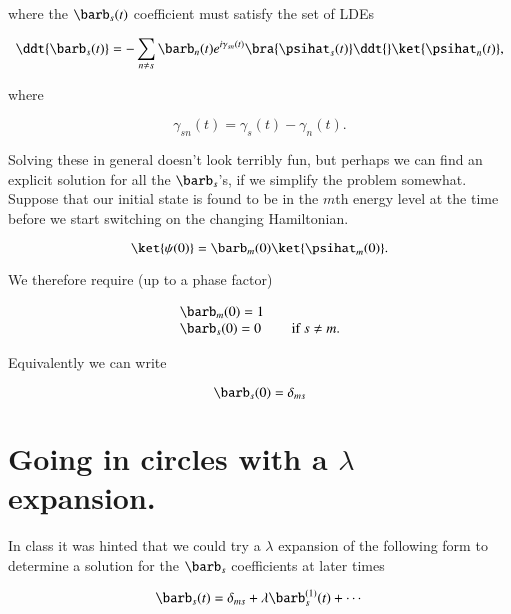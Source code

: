 where the $\barb_s(t)$ coefficient must satisfy the set of LDEs 

\begin{equation}\label{eqn:adiabaticApprox:50}
\ddt{\barb_s(t)} = - \sum_{n \ne s} \barb_n(t) e^{i \gamma_{sn}(t) } \bra{\psihat_s(t)} \ddt{} \ket{\psihat_n(t)},
\end{equation}

where

\begin{equation}\label{eqn:adiabaticApprox:70}
\gamma_{sn}(t) = \gamma_{s}(t) - \gamma_{n}(t).
\end{equation}

Solving these in general doesn't look terribly fun, but perhaps we can find an explicit solution for all the $\barb_s$'s, if we simplify the problem somewhat.  Suppose that our initial state is found to be in the $m$th energy level at the time before we start switching on the changing Hamiltonian.

\begin{equation}\label{eqn:adiabaticApprox:90}
\ket{\psi(0)} = \barb_m(0) \ket{\psihat_m(0)}.
\end{equation}

We therefore require (up to a phase factor)

\begin{equation}\label{eqn:adiabaticApprox:110}
\begin{array}{l l}
\barb_m(0) = 1 & \\
\barb_s(0) = 0 & \quad \mbox{if $s \ne m$}.
\end{array}
\end{equation}

Equivalently we can write

\begin{equation}\label{eqn:adiabaticApprox:130}
\barb_s(0) = \delta_{ms}
\end{equation}

\section{Going in circles with a $\lambda$ expansion.}

In class it was hinted that we could try a $\lambda$ expansion of the following form to determine a solution for the $\barb_s$ coefficients at later times

\begin{equation}\label{eqn:adiabaticApprox:150}
\barb_s(t) = \delta_{ms} + \lambda \barb^{(1)}_s(t) + \cdots
\end{equation}

